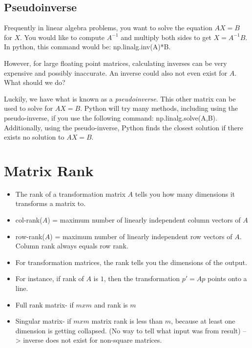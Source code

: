\documentclass{article}
\begin{document}
\subsection{Pseudoinverse}

Frequently in linear algebra problems, you want to solve the equation $AX=B$ for $X$. You would like to compute $A^{-1}$ and multiply both sides to get $X=A^{-1}B$. In python, this command would be: np.linalg.inv(A)*B.

However, for large floating point matrices, calculating inverses can be very expensive and possibly inaccurate. An inverse could also not even exist for $A$. What should we do?

Luckily, we have what is known as a \textit{pseudoinverse}. This other matrix can be used to solve for $AX=B$. Python will try many methods, including using the pseudo-inverse, if you use the following command: np.linalg.solve(A,B). Additionally, using the pseudo-inverse, Python finds the closest solution if there exists no solution to $AX=B$.

\section{Matrix Rank}
\begin{itemize}
\item The rank of a transformation matrix  $A$ tells you how many dimensions it transforms a matrix to.

\item col-rank($A$) = maximum number of linearly independent column vectors of $A$

\item row-rank($A$) = maximum number of linearly independent row vectors of $A$.
Column rank always equals row rank.

\item For transformation matrices, the rank tells you the dimensions of the output.

\item For instance, if rank of $A$ is $1$, then the transformation $p' =Ap$ points onto a line.

\item Full rank matrix- if $mxm$ and rank is $m$

\item Singular matrix- if $mxm$ matrix rank is less than $m$, because at least one dimension is getting collapsed. (No way to tell what input was from result) --> inverse does not exist for non-square matrices.
\end{itemize}
\end{document}

